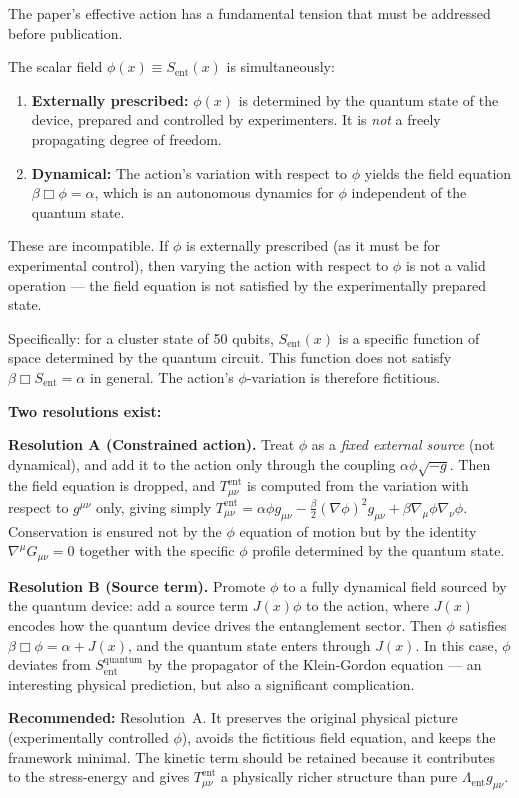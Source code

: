 \documentclass[12pt,letterpaper]{article}
\theoremstyle{plain}
\theoremstyle{definition}
\theoremstyle{remark}
\newcommand{\Sent}{S_{\mathrm{ent}}}
\begin{document}
\begin{flagbox}
The paper's effective action has a fundamental tension that must be addressed before publication.

The scalar field $\phi(x) \equiv \Sent(x)$ is simultaneously:
\begin{enumerate}[label=(\alph*)]
\item \textbf{Externally prescribed:} $\phi(x)$ is determined by the quantum state of the device, prepared and controlled by experimenters. It is \emph{not} a freely propagating degree of freedom.
\item \textbf{Dynamical:} The action's variation with respect to $\phi$ yields the field equation $\beta\Box\phi = \alpha$, which is an autonomous dynamics for $\phi$ independent of the quantum state.
\end{enumerate}
These are incompatible. If $\phi$ is externally prescribed (as it must be for experimental control), then varying the action with respect to $\phi$ is not a valid operation --- the field equation is not satisfied by the experimentally prepared state.

Specifically: for a cluster state of 50 qubits, $\Sent(x)$ is a specific function of space determined by the quantum circuit. This function does not satisfy $\beta\Box\Sent = \alpha$ in general. The action's $\phi$-variation is therefore fictitious.

\textbf{Two resolutions exist:}

\textbf{Resolution A (Constrained action).} Treat $\phi$ as a \emph{fixed external source} (not dynamical), and add it to the action only through the coupling $\alpha\phi\sqrt{-g}$. Then the field equation is dropped, and $T^{\mathrm{ent}}_{\mu\nu}$ is computed from the variation with respect to $g^{\mu\nu}$ only, giving simply $T^{\mathrm{ent}}_{\mu\nu} = \alpha\phi g_{\mu\nu} - \tfrac{\beta}{2}(\nabla\phi)^2 g_{\mu\nu} + \beta\nabla_\mu\phi\nabla_\nu\phi$. Conservation is ensured not by the $\phi$ equation of motion but by the identity $\nabla^\mu G_{\mu\nu} = 0$ together with the specific $\phi$ profile determined by the quantum state.

\textbf{Resolution B (Source term).} Promote $\phi$ to a fully dynamical field sourced by the quantum device: add a source term $J(x)\phi$ to the action, where $J(x)$ encodes how the quantum device drives the entanglement sector. Then $\phi$ satisfies $\beta\Box\phi = \alpha + J(x)$, and the quantum state enters through $J(x)$. In this case, $\phi$ deviates from $\Sent^{\mathrm{quantum}}$ by the propagator of the Klein-Gordon equation --- an interesting physical prediction, but also a significant complication.

\textbf{Recommended:} Resolution~A. It preserves the original physical picture (experimentally controlled $\phi$), avoids the fictitious field equation, and keeps the framework minimal. The kinetic term should be retained because it contributes to the stress-energy and gives $T^{\mathrm{ent}}_{\mu\nu}$ a physically richer structure than pure $\Lambda_{\mathrm{ent}}g_{\mu\nu}$.
\end{flagbox}
\end{document}
